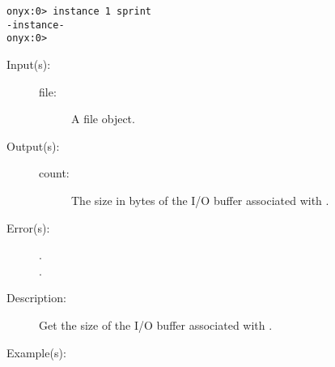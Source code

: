 \begin{description}
\begin{description}
\begin{verbatim}
onyx:0> instance 1 sprint
-instance-
onyx:0>
		\end{verbatim}
	\end{description}
\label{systemdict:iobuf}
\item[{\onyxop{file}{iobuf}{count}}: ]
	\begin{description}\item[]
	\item[Input(s): ]
		\begin{description}\item[]
		\item[file: ]
			A file object.
		\end{description}
	\item[Output(s): ]
		\begin{description}\item[]
		\item[count: ]
			The size in bytes of the I/O buffer associated with
			.
		\end{description}
	\item[Error(s): ]
		\begin{description}\item[]
		\item[.]
		\item[.]
		\end{description}
	\item[Description: ]
		Get the size of the I/O buffer associated with .
	\item[Example(s): ]\begin{verbatim}


\end{verbatim}
\end{description}
\end{description}
